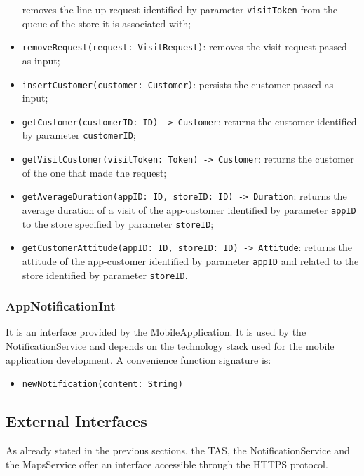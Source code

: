 \documentclass[a4paper,oneside,11pt]{book}
\newcommand{\red}[1]{\begingroup\color{punct}#1\endgroup}
\begin{document}
\begin{itemize}
       removes the line-up request identified by parameter \texttt{visitToken} from the queue of the store it is associated with;
       \item \texttt{removeRequest(request: \red{VisitRequest})}: \newline
       removes the visit request passed as input;
       \item \texttt{insertCustomer(customer: \red{Customer})}: \newline
       persists the customer passed as input;
       \item \texttt{getCustomer(customerID: \red{ID}) -> \red{Customer}}: \newline
       returns the customer identified by parameter \texttt{customerID};
       \item \texttt{getVisitCustomer(visitToken: \red{Token}) -> \red{Customer}}: \newline
       returns the customer of the one that made the request;
       \item \texttt{getAverageDuration(appID: \red{ID}, storeID: \red{ID}) -> \red{Duration}}: \newline
       returns the average duration of a visit of the app-customer identified by parameter \texttt{appID} to the store specified by parameter \texttt{storeID};
       \item \texttt{getCustomerAttitude(appID: \red{ID}, storeID: \red{ID}) -> \red{Attitude}}: \newline
       returns the attitude of the app-customer identified by parameter \texttt{appID} and related to the store identified by parameter \texttt{storeID}.
   \end{itemize}
   
    \subsubsection{AppNotificationInt}
    It is an interface provided by the MobileApplication. It is used by the NotificationService and depends on the technology stack used for the mobile application development. A convenience function signature is:
    \begin{itemize}
        \item \texttt{newNotification(content: \red{String})}
    \end{itemize}
    
    \subsection{External Interfaces}
    As already stated in the previous sections, the TAS, the NotificationService and the MapsService offer an interface accessible through the HTTPS protocol. 
\end{document}
